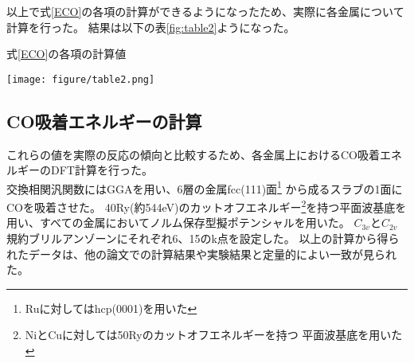 \documentclass[12pt]{ltjsarticle}
\begin{document}
以上で式\ref{ECO}の各項の計算ができるようになったため、実際に各金属について計算を行った。
結果は以下の表\ref{fig:table2}ようになった。
\begin{table}[hbtp]
    \begin{center}
    \caption{式\ref{ECO}の各項の計算値}
     \texttt{[image: figure/table2.png]}
    \end{center}
    \label{fig:table2}
\end{table}

\subsection{CO吸着エネルギーの計算}
これらの値を実際の反応の傾向と比較するため、各金属上におけるCO吸着エネルギーのDFT計算を行った。\\
交換相関汎関数にはGGAを用い、6層の金属fcc(111)面\footnote{Ruに対してはhcp(0001)を用いた}
から成るスラブの1面にCOを吸着させた。
40Ry(約544eV)のカットオフエネルギー\footnote{NiとCuに対しては50Ryのカットオフエネルギーを持つ
平面波基底を用いた}を持つ平面波基底を用い、すべての金属においてノルム保存型擬ポテンシャルを用いた。
$C_{3v}$と$C_{2v}$規約ブリルアンゾーンにそれぞれ6、15のk点を設定した。
以上の計算から得られたデータは、他の論文での計算結果や実験結果と定量的によい一致が見られた。
\end{document}
